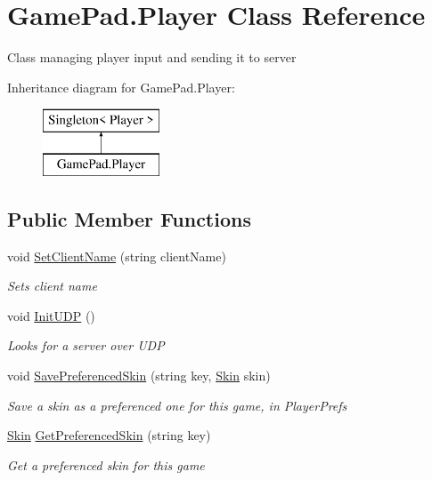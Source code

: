 \hypertarget{class_game_pad_1_1_player}{}\section{Game\+Pad.\+Player Class Reference}
\label{class_game_pad_1_1_player}


Class managing player input and sending it to server  


Inheritance diagram for Game\+Pad.\+Player\+:\begin{figure}[H]
\begin{center}
\leavevmode
\includegraphics[height=2.000000cm]{class_game_pad_1_1_player}
\end{center}
\end{figure}
\subsection*{Public Member Functions}
\begin{DoxyCompactItemize}
\item 
void \mbox{\hyperlink{class_game_pad_1_1_player_a40520d0dcb776c329eaa27df71530c7e}{Set\+Client\+Name}} (string client\+Name)
\begin{DoxyCompactList}\small\item\em Sets client name \end{DoxyCompactList}\item 
void \mbox{\hyperlink{class_game_pad_1_1_player_acaaa78dc94fecedd9df486c55c5d2d14}{Init\+U\+DP}} ()
\begin{DoxyCompactList}\small\item\em Looks for a server over U\+DP \end{DoxyCompactList}\item 
void \mbox{\hyperlink{class_game_pad_1_1_player_a7705aed9995934feca3ff7ac798f52ed}{Save\+Preferenced\+Skin}} (string key, \mbox{\hyperlink{class_skin}{Skin}} skin)
\begin{DoxyCompactList}\small\item\em Save a skin as a preferenced one for this game, in Player\+Prefs \end{DoxyCompactList}\item 
\mbox{\hyperlink{class_skin}{Skin}} \mbox{\hyperlink{class_game_pad_1_1_player_ab9a2029ba8cc16a59a4e888fd124737a}{Get\+Preferenced\+Skin}} (string key)
\begin{DoxyCompactList}\small\item\em Get a preferenced skin for this game \end{DoxyCompactList}\end{DoxyCompactItemize}
